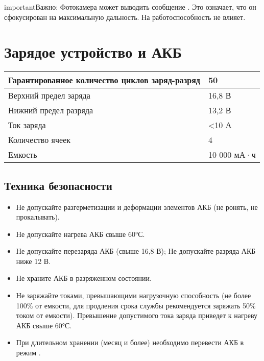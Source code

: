 \documentclass[a4paper,10pt,russian,openany]{sphinxmanual}
\begin{document}
\begin{sphinxadmonition}{important}{Важно:}
Фотокамера может выводить сообщение . Это означает, что он сфокусирован на максимальную дальность. На работоспособность не влияет.
\end{sphinxadmonition}


\chapter{Зарядое устройство и АКБ}
\label{\detokenize{charger:id1}}\label{\detokenize{charger::doc}}

\begin{savenotes}\sphinxattablestart
\centering
{}
\sphinxthecaptionisattop
{}\label{\detokenize{charger:id8}}
\sphinxaftertopcaption
\begin{tabulary}{\linewidth}[t]{|T|T|}
\hline

Гарантированное количество циклов заряд-разряд
&
50
\\
\hline
Верхний предел заряда
&
16,8 В
\\
\hline
Нижний предел разряда
&
13,2 В
\\
\hline
Ток заряда
&
\textless{}10 А
\\
\hline
Количество ячеек
&
4
\\
\hline
Емкость
&
10 000 мА·ч
\\
\hline
\end{tabulary}
\par
\sphinxattableend\end{savenotes}


\section{Техника безопасности}
\label{\detokenize{charger:id2}}
\begin{itemize}
\item {} 
Не допускайте разгерметизации и деформации элементов АКБ (не ронять, не прокалывать).

\item {} 
Не допускайте нагрева АКБ свыше 60°С.

\item {} 
Не допускайте перезаряда АКБ (свыше 16,8 В); Не допускайте разряда АКБ ниже 12 В.

\item {} 
Не храните АКБ в разряженном состоянии.

\item {} 
Не заряжайте токами, превышающими нагрузочную способность (не более 100\% от емкости, для продления срока службы рекомендуется заряжать 50\% током от емкости). Превышение допустимого тока заряда приведет к нагреву АКБ свыше 60°С.

\item {} 
При длительном хранении (месяц и более) необходимо перевести АКБ в режим .

\end{itemize}
\end{document}
